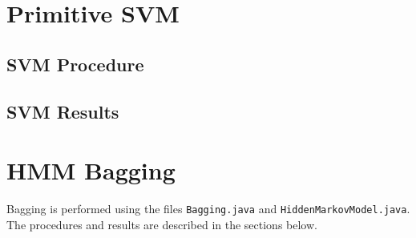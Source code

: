 \documentclass[12pt]{article}
\begin{document}
\section{Primitive SVM}
  \subsection{SVM Procedure}
  \subsection{SVM Results}

\section{HMM Bagging}
  Bagging is performed using the files \texttt{Bagging.java} and \texttt{HiddenMarkovModel.java}. The procedures and results are described in the sections below.
\end{document}
